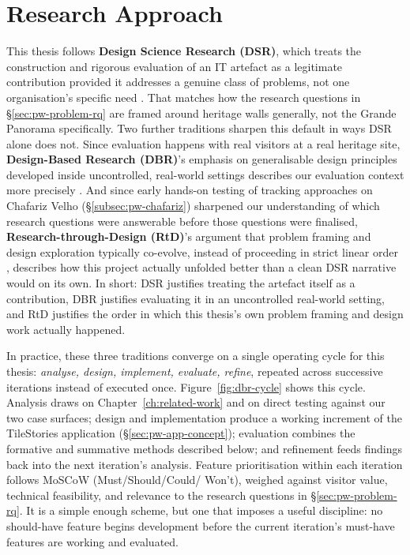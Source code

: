 \section{Research Approach}
\label{sec:pw-approach}
 
This thesis follows \textbf{Design Science Research (DSR)}, which treats
the construction and rigorous evaluation of an IT artefact as a
legitimate contribution provided it addresses a genuine class of
problems, not one organisation's specific need
\cite{hevner2004}. That matches how the research questions in
\S\ref{sec:pw-problem-rq} are framed around heritage walls generally, not
the Grande Panorama specifically. Two further traditions sharpen this
default in ways DSR alone does not. Since evaluation happens with real
visitors at a real heritage site,
\textbf{Design-Based Research (DBR)}'s emphasis on generalisable design
principles developed inside uncontrolled, real-world settings describes
our evaluation context more precisely
\cite{wanghannafin2005,andersonshattuck2012}. And since early hands-on
testing of tracking approaches on Chafariz Velho
(\S\ref{subsec:pw-chafariz}) sharpened our understanding of which
research questions were answerable before those questions were
finalised, \textbf{Research-through-Design (RtD)}'s argument that problem
framing and design exploration typically co-evolve, instead of
proceeding in strict linear order \cite{zimmerman2007}, describes how
this project actually unfolded better than a clean DSR narrative would on
its own. In short: DSR justifies treating the artefact itself as a
contribution, DBR justifies evaluating it in an uncontrolled real-world
setting, and RtD justifies the order in which this thesis's own problem
framing and design work actually happened.
 
In practice, these three traditions converge on a single operating
cycle for this thesis: \emph{analyse, design, implement, evaluate,
refine}, repeated across successive iterations instead of executed once.
Figure~\ref{fig:dbr-cycle} shows this cycle. Analysis draws on
Chapter~\ref{ch:related-work} and on direct testing against our two case
surfaces; design and implementation produce a working increment of the
TileStories application (\S\ref{sec:pw-app-concept}); evaluation combines
the formative and summative methods described below; and refinement
feeds findings back into the next iteration's analysis. Feature
prioritisation within each iteration follows MoSCoW (Must/Should/Could/
Won't), weighed against visitor value, technical feasibility, and
relevance to the research questions in \S\ref{sec:pw-problem-rq}. It is a
simple enough scheme, but one that imposes a useful discipline: no
should-have feature begins development before the current iteration's
must-have features are working and evaluated.
 
